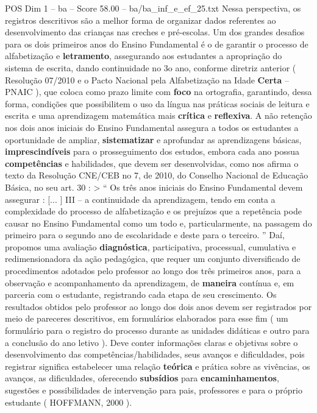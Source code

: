\begin{textsample}{POS Dim 1 – ba – Score 58.00 – ba/ba\_inf\_e\_ef\_25.txt}
Nessa perspectiva, os registros descritivos são a melhor forma de organizar dados referentes ao desenvolvimento das crianças nas creches e pré-escolas.
Um dos grandes desafios para os dois primeiros anos do Ensino Fundamental é o de garantir o processo de alfabetização e \textbf{letramento}, assegurando aos estudantes a apropriação do sistema de escrita, dando continuidade no 3o ano, conforme diretriz anterior ( Resolução 07/2010 e o Pacto Nacional pela Alfabetização na Idade \textbf{Certa} – PNAIC ), que coloca como prazo limite com \textbf{foco} na ortografia, garantindo, dessa forma, condições que possibilitem o uso da língua nas práticas sociais de leitura e escrita e uma aprendizagem matemática mais \textbf{crítica} e \textbf{reflexiva}.
A não retenção nos dois anos iniciais do Ensino Fundamental assegura a todos os estudantes a oportunidade de ampliar, \textbf{sistematizar} e aprofundar as aprendizagens básicas, \textbf{imprescindíveis} para o prosseguimento dos estudos, embora cada ano possua \textbf{competências} e habilidades, que devem ser desenvolvidas, como nos afirma o texto da Resolução CNE/CEB no 7, de 2010, do Conselho Nacional de Educação Básica, no seu art. 30 : > “ Os três anos iniciais do Ensino Fundamental devem assegurar : [... ] III – a continuidade da aprendizagem, tendo em conta a complexidade do processo de alfabetização e os prejuízos que a repetência pode causar no Ensino Fundamental como um todo e, particularmente, na passagem do primeiro para o segundo ano de escolaridade e deste para o terceiro. ” Daí, propomos uma avaliação \textbf{diagnóstica}, participativa, processual, cumulativa e redimensionadora da ação pedagógica, que requer um conjunto diversificado de procedimentos adotados pelo professor ao longo dos três primeiros anos, para a observação e acompanhamento da aprendizagem, de \textbf{maneira} contínua e, em parceria com o estudante, registrando cada etapa de seu crescimento.
Os resultados obtidos pelo professor ao longo dos dois anos devem ser registrados por meio de pareceres descritivos, em formulários elaborados para esse fim ( um formulário para o registro do processo durante as unidades didáticas e outro para a conclusão do ano letivo ).
Deve conter informações claras e objetivas sobre o desenvolvimento das competências/habilidades, seus avanços e dificuldades, pois registrar significa estabelecer uma relação \textbf{teórica} e prática sobre as vivências, os avanços, as dificuldades, oferecendo \textbf{subsídios} para \textbf{encaminhamentos}, sugestões e possibilidades de intervenção para pais, professores e para o próprio estudante ( HOFFMANN, 2000 ).

\end{textsample}
